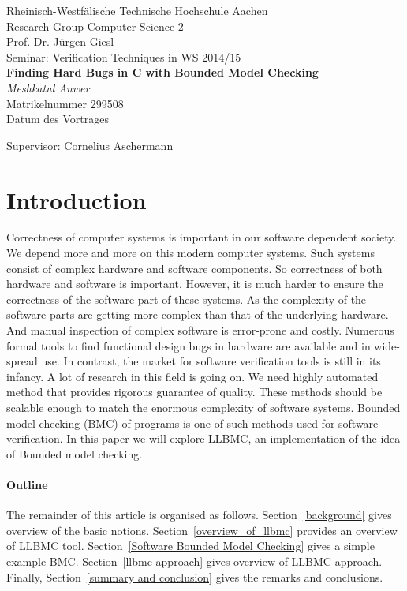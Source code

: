 \documentclass[14pt]{article}
\begin{document}
\begin{center}

    Rheinisch-Westf\"alische Technische Hochschule Aachen \\
    Research Group Computer Science 2\\
    Prof. Dr. J\"urgen Giesl\\[6ex]
    Seminar: Verification Techniques in WS 2014/15\\[12ex]                          %
   
    \LARGE
    \textbf{Finding Hard Bugs in C with Bounded Model Checking} \\[6ex]
    \textit{Meshkatul Anwer} \\[6ex]
    \Large
    Matrikelnummer 299508 \\[6ex]
    Datum des Vortrages

    \vfill
    \Large Supervisor: Cornelius Aschermann
	    
\end{center}


\section{Introduction}
Correctness of computer systems is important in our software dependent society. We depend more and more on this modern computer systems. Such systems consist of complex hardware and software components. So correctness of both hardware and software is important. However, it is much harder to ensure the correctness of the software part of these systems. As the complexity of the software parts are getting more complex than that of the underlying hardware. And manual inspection of complex software is error-prone and costly. Numerous formal tools to find functional design bugs in hardware are available and in wide-spread use. In contrast, the market for software verification tools is still in its infancy. A lot of research in this field is going on. We need highly automated method that provides rigorous guarantee of quality. These methods should be scalable enough to match the enormous complexity of software systems. Bounded model checking (BMC) of programs is one of such methods used for software verification. In this paper we will explore LLBMC, an implementation of the idea of Bounded model checking.


\paragraph{Outline}
The remainder of this article is organised as follows.
Section~\ref{background} gives overview of the basic notions.
Section~\ref{overview_of_llbmc} provides an overview of LLBMC tool.
Section~\ref{Software Bounded Model Checking} gives a simple example BMC.
Section~\ref{llbmc approach} gives overview of LLBMC approach.
Finally, Section~\ref{summary and conclusion} gives the remarks and conclusions.
\end{document}
